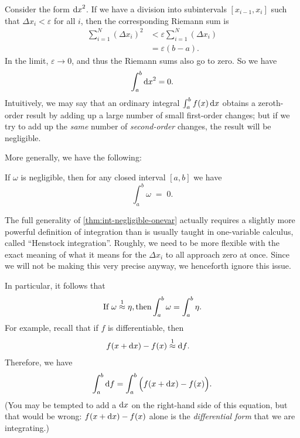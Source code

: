 \documentclass[12pt]{amsart}
\begin{document}
\begin{eg}
  Consider the form ${\mathrm{d} x}^2$.
  If we have a division into subintervals $[x_{i-1},x_i]$ such that $\Delta x_i < \varepsilon$ for all $i$, then the corresponding Riemann sum is
  \begin{align*}
    \sum_{i=1}^N (\Delta x_i)^2 &< \varepsilon \sum_{i=1}^N (\Delta x_i)\\
    &= \varepsilon (b-a).
  \end{align*}
  In the limit, $\varepsilon \to 0$, and thus the Riemann sums also go to zero.
  So we have
  \[ \int_a^b {\mathrm{d} x}^2 = 0. \]
  Intuitively, we may say that an ordinary integral $\int_a^b f(x) \,{\mathrm{d} x}$ obtains a zeroth-order result by adding up a large number of small first-order changes; but if we try to add up the \emph{same} number of \emph{second-order} changes, the result will be negligible.
\end{eg}

More generally, we have the following:

\begin{thm}\label{thm:int-negligible-onevar}
  If $\omega$ is negligible, then for any closed interval $[a,b]$ we have
  \[ \int_a^b \omega \;=\; 0.\]
\end{thm}

\begin{adv}
  The full generality of \cref{thm:int-negligible-onevar} actually requires a slightly more powerful definition of integration than is usually taught in one-variable calculus, called ``Henstock integration''.
  Roughly, we need to be more flexible with the exact meaning of what it means for the $\Delta x_i$ to all approach zero at once.
  Since we will not be making this very precise anyway, we henceforth ignore this issue.
\end{adv}

In particular, it follows that
\begin{equation}\label{eq:int-apx1-equal}
  \text{If }\omega\mathrel{\overset{1}{\approx}} \eta, \text{then} \displaystyle\int_a^b \omega = \int_a^b \eta.
\end{equation}
For example, recall that if $f$ is differentiable, then
\begin{align*}
  f(x+\dx)-f(x) &\apx1 \df. %
\end{align*}
Therefore, we have
\[ \int_a^b {\mathrm{d} f} = \int_a^b \Big(f(x+{\mathrm{d} x}) - f(x)\Big). \]
(You may be tempted to add a ${\mathrm{d} x}$ on the right-hand side of this equation, but that would be wrong: $f(x+{\mathrm{d} x}) - f(x)$ alone is the \emph{differential form} that we are integrating.)
\end{document}

